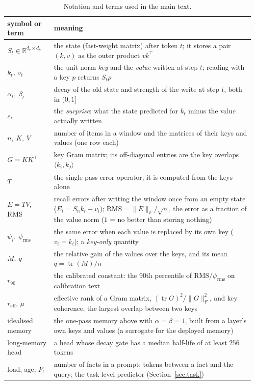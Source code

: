 \documentclass{article}
\newcommand{\R}{\mathbb{R}}
\newcommand{\tr}{\operatorname{tr}}
\begin{document}
\begin{table}[!t]
  \caption{Notation and terms used in the main text.}\label{tab:notation}
  \centering\small\setlength{\tabcolsep}{4pt}
  \begin{tabular}{@{}>{\raggedright\arraybackslash}p{3.1cm}>{\raggedright\arraybackslash}p{12.2cm}@{}}
    \toprule
    symbol or term & meaning \\
    \midrule
    $S_t\in\R^{d_v\times d_k}$ & the state (fast-weight matrix) after token $t$; it stores a pair $(k,v)$ as the outer product $vk^\top$ \\
    $k_t,\ v_t$ & the unit-norm \emph{key} and the \emph{value} written at step $t$; reading with a key $p$ returns $S_tp$ \\
    $\alpha_t,\ \beta_t$ & decay of the old state and strength of the write at step $t$, both in $(0,1]$ \\
    $e_t$ & the \emph{surprise}: what the state predicted for $k_t$ minus the value actually written \\
    $n,\ K,\ V$ & number of items in a window and the matrices of their keys and values (one row each) \\
    $G=KK^\top$ & key Gram matrix; its off-diagonal entries are the key overlaps $\langle k_i,k_j\rangle$ \\
    $T$ & the single-pass error operator; it is computed from the keys alone \\
    $E=TV$, RMS & recall errors after writing the window once from an empty state ($E_i=S_nk_i-v_i$); $\mathrm{RMS}=\|E\|_F/\sqrt n$, the error as a fraction of the value norm ($1$ = no better than storing nothing) \\
    $\psi_i,\ \psi_{\mathrm{rms}}$ & the same error when each value is replaced by its own key ($v_i=k_i$); a \emph{key-only} quantity \\
    $M,\ q$ & the relative gain of the values over the keys, and its mean $q=\tr(M)/n$ \\
    $r_{90}$ & the calibrated constant: the 90th percentile of $\mathrm{RMS}/\psi_{\mathrm{rms}}$ on calibration text \\
    $r_{\mathrm{eff}}$, $\mu$ & effective rank of a Gram matrix, $(\tr G)^2/\|G\|_F^2$, and key coherence, the largest overlap between two keys \\
    idealised memory & the one-pass memory above with $\alpha=\beta=1$, built from a layer's own keys and values (a surrogate for the deployed memory) \\
    long-memory head & a head whose decay gate has a median half-life of at least 256 tokens \\
    load, age, $P_1$ & number of facts in a prompt; tokens between a fact and the query; the task-level predictor (Section~\ref{sec:task}) \\
    \bottomrule
  \end{tabular}
\end{table}
\end{document}
